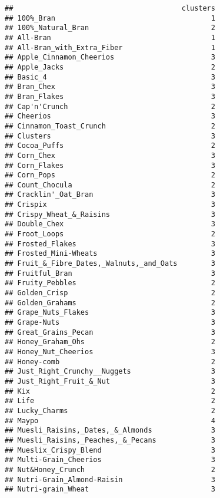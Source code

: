 \documentclass[
]{article}
\begin{document}
\begin{verbatim}
##                                        clusters
## 100%_Bran                                     1
## 100%_Natural_Bran                             2
## All-Bran                                      1
## All-Bran_with_Extra_Fiber                     1
## Apple_Cinnamon_Cheerios                       3
## Apple_Jacks                                   2
## Basic_4                                       3
## Bran_Chex                                     3
## Bran_Flakes                                   3
## Cap'n'Crunch                                  2
## Cheerios                                      3
## Cinnamon_Toast_Crunch                         2
## Clusters                                      3
## Cocoa_Puffs                                   2
## Corn_Chex                                     3
## Corn_Flakes                                   3
## Corn_Pops                                     2
## Count_Chocula                                 2
## Cracklin'_Oat_Bran                            3
## Crispix                                       3
## Crispy_Wheat_&_Raisins                        3
## Double_Chex                                   3
## Froot_Loops                                   2
## Frosted_Flakes                                3
## Frosted_Mini-Wheats                           3
## Fruit_&_Fibre_Dates,_Walnuts,_and_Oats        3
## Fruitful_Bran                                 3
## Fruity_Pebbles                                2
## Golden_Crisp                                  2
## Golden_Grahams                                2
## Grape_Nuts_Flakes                             3
## Grape-Nuts                                    3
## Great_Grains_Pecan                            3
## Honey_Graham_Ohs                              2
## Honey_Nut_Cheerios                            3
## Honey-comb                                    2
## Just_Right_Crunchy__Nuggets                   3
## Just_Right_Fruit_&_Nut                        3
## Kix                                           2
## Life                                          2
## Lucky_Charms                                  2
## Maypo                                         4
## Muesli_Raisins,_Dates,_&_Almonds              3
## Muesli_Raisins,_Peaches,_&_Pecans             3
## Mueslix_Crispy_Blend                          3
## Multi-Grain_Cheerios                          3
## Nut&Honey_Crunch                              2
## Nutri-Grain_Almond-Raisin                     3
## Nutri-grain_Wheat                             3

\end{verbatim}
\end{document}
